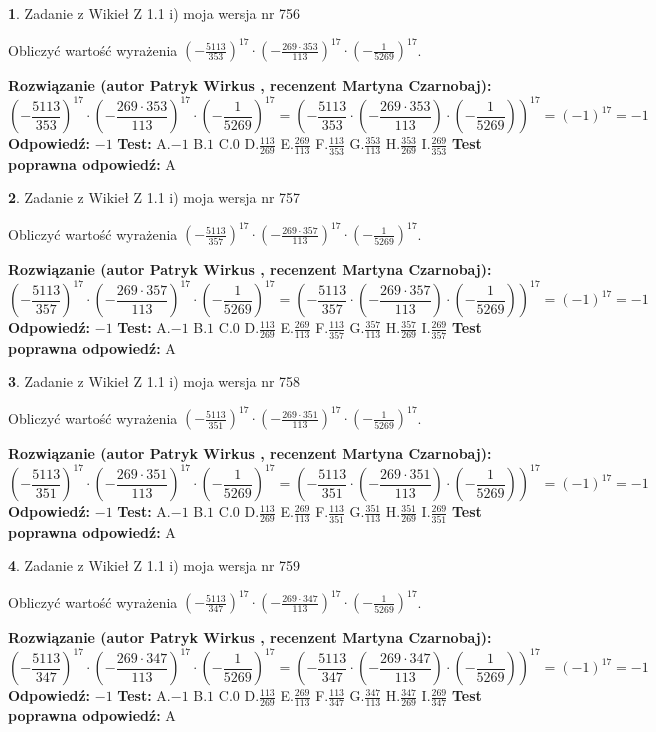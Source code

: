 \documentclass[12pt, a4paper]{article}
\theoremstyle{definition} %
\newtheorem{zad}{}
\newcommand{\zadStart}[1]{\begin{zad}#1\newline}
\newcommand{\zadStop}{\end{zad}}
\newcommand{\rozwStart}[2]{\noindent \textbf{Rozwiązanie (autor #1 , recenzent #2): }\newline}
\newcommand{\rozwStop}{\newline}
\newcommand{\odpStart}{\noindent \textbf{Odpowiedź:}\newline}
\newcommand{\odpStop}{\newline}
\newcommand{\testStart}{\noindent \textbf{Test:}\newline}
\newcommand{\testStop}{\newline}
\newcommand{\kluczStart}{\noindent \textbf{Test poprawna odpowiedź:}\newline}
\newcommand{\kluczStop}{\newline}
\begin{document}
\zadStart{Zadanie z Wikieł Z 1.1 i) moja wersja nr 756}

Obliczyć wartość wyrażenia $(-\frac{5113}{353})^{17} \cdot (-\frac{269 \cdot 353}{113})^{17} \cdot (-\frac{1}{5269})^{17}$.
\zadStop
\rozwStart{Patryk Wirkus}{Martyna Czarnobaj}
$$(-\frac{5113}{353})^{17} \cdot (-\frac{269 \cdot 353}{113})^{17} \cdot (-\frac{1}{5269})^{17} = (-\frac{5113}{353} \cdot (-\frac{269 \cdot 353}{113}) \cdot (-\frac{1}{5269}))^{17} = (-1)^{17} = -1$$
\rozwStop
\odpStart
$-1$
\odpStop
\testStart
A.$-1$ B.$1$ C.$0$ D.$\frac{113}{269}$ E.$\frac{269}{113}$
F.$\frac{113}{353}$ G.$\frac{353}{113}$
H.$\frac{353}{269}$
I.$\frac{269}{353}$
\testStop
\kluczStart
A
\kluczStop



\zadStart{Zadanie z Wikieł Z 1.1 i) moja wersja nr 757}

Obliczyć wartość wyrażenia $(-\frac{5113}{357})^{17} \cdot (-\frac{269 \cdot 357}{113})^{17} \cdot (-\frac{1}{5269})^{17}$.
\zadStop
\rozwStart{Patryk Wirkus}{Martyna Czarnobaj}
$$(-\frac{5113}{357})^{17} \cdot (-\frac{269 \cdot 357}{113})^{17} \cdot (-\frac{1}{5269})^{17} = (-\frac{5113}{357} \cdot (-\frac{269 \cdot 357}{113}) \cdot (-\frac{1}{5269}))^{17} = (-1)^{17} = -1$$
\rozwStop
\odpStart
$-1$
\odpStop
\testStart
A.$-1$ B.$1$ C.$0$ D.$\frac{113}{269}$ E.$\frac{269}{113}$
F.$\frac{113}{357}$ G.$\frac{357}{113}$
H.$\frac{357}{269}$
I.$\frac{269}{357}$
\testStop
\kluczStart
A
\kluczStop



\zadStart{Zadanie z Wikieł Z 1.1 i) moja wersja nr 758}

Obliczyć wartość wyrażenia $(-\frac{5113}{351})^{17} \cdot (-\frac{269 \cdot 351}{113})^{17} \cdot (-\frac{1}{5269})^{17}$.
\zadStop
\rozwStart{Patryk Wirkus}{Martyna Czarnobaj}
$$(-\frac{5113}{351})^{17} \cdot (-\frac{269 \cdot 351}{113})^{17} \cdot (-\frac{1}{5269})^{17} = (-\frac{5113}{351} \cdot (-\frac{269 \cdot 351}{113}) \cdot (-\frac{1}{5269}))^{17} = (-1)^{17} = -1$$
\rozwStop
\odpStart
$-1$
\odpStop
\testStart
A.$-1$ B.$1$ C.$0$ D.$\frac{113}{269}$ E.$\frac{269}{113}$
F.$\frac{113}{351}$ G.$\frac{351}{113}$
H.$\frac{351}{269}$
I.$\frac{269}{351}$
\testStop
\kluczStart
A
\kluczStop



\zadStart{Zadanie z Wikieł Z 1.1 i) moja wersja nr 759}

Obliczyć wartość wyrażenia $(-\frac{5113}{347})^{17} \cdot (-\frac{269 \cdot 347}{113})^{17} \cdot (-\frac{1}{5269})^{17}$.
\zadStop
\rozwStart{Patryk Wirkus}{Martyna Czarnobaj}
$$(-\frac{5113}{347})^{17} \cdot (-\frac{269 \cdot 347}{113})^{17} \cdot (-\frac{1}{5269})^{17} = (-\frac{5113}{347} \cdot (-\frac{269 \cdot 347}{113}) \cdot (-\frac{1}{5269}))^{17} = (-1)^{17} = -1$$
\rozwStop
\odpStart
$-1$
\odpStop
\testStart
A.$-1$ B.$1$ C.$0$ D.$\frac{113}{269}$ E.$\frac{269}{113}$
F.$\frac{113}{347}$ G.$\frac{347}{113}$
H.$\frac{347}{269}$
I.$\frac{269}{347}$
\testStop
\kluczStart
A
\kluczStop
\end{document}
